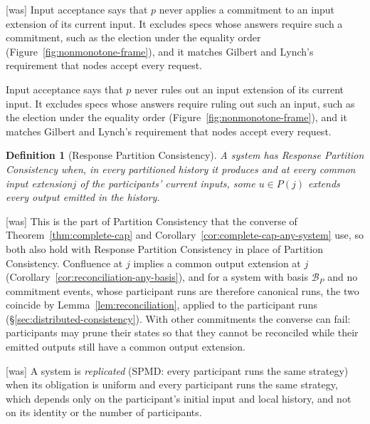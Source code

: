\documentclass[sigconf]{cidr-2027}
\newtheorem{definition}{Definition}
\theoremstyle{remark}
\newcommand{\commitment}{commitment\xspace}
\newcommand{\commitments}{commitments\xspace}
\newcommand{\indesc}{input extension\xspace} %
\newcommand{\outrel}{extends\xspace}          %
\newcommand{\outnoun}{output extension\xspace}%
\newcommand{\fiber}[1]{P(#1)}
\begin{document}
{\footnotesize\color{black!50}\noindent\textsf{[was]} Input acceptance says that $p$ never applies a \commitment to an \indesc of its current input.
It excludes specs whose answers require such a \commitment, such as the
election under the equality order (Figure~\ref{fig:nonmonotone-frame}), and it
matches Gilbert and Lynch's
requirement that nodes accept every request.\par}

\color{blue!70!black}Input acceptance says that $p$ never rules out an \indesc of its current
input.  It excludes specs whose answers require ruling out such an input, such
as the election under the equality order (Figure~\ref{fig:nonmonotone-frame}),
and it matches Gilbert and Lynch's requirement that nodes accept every
request.\color{black}

\begin{definition}[Response Partition Consistency]
\label{def:response-partition-consistency}
A system has \emph{Response Partition Consistency} when, in every partitioned
history it produces and at every common \indesc $j$ of the participants'
current inputs, some $u\in\fiber{j}$ \outrel every output emitted in the
history.
\end{definition}



{\footnotesize\color{black!50}\noindent\textsf{[was]} This is the part of Partition Consistency that the converse of
Theorem~\ref{thm:complete-cap} and Corollary~\ref{cor:complete-cap-any-system}
use, so both also hold with Response
Partition Consistency in place of Partition Consistency.  Confluence at $j$
implies a common \outnoun at $j$ (Corollary~\ref{cor:reconciliation-any-basis}),
and for a system with basis $\mathcal B_P$ and no \commitment events, whose
participant runs are therefore canonical runs, the two coincide by Lemma~\ref{lem:reconciliation}, applied to the participant runs
(\S\ref{sec:distributed-consistency}).  With other \commitments the
converse can fail: participants may prune their states so that they cannot
be reconciled while their emitted outputs still have a common \outnoun.\par}



{\footnotesize\color{black!50}\noindent\textsf{[was]} A system is \emph{replicated} (SPMD: every participant runs the same strategy)
when its obligation is uniform and every participant runs the same strategy,
which depends only on the participant's
initial input and local history, and not on its identity or the number of
participants.\par}
\end{document}
